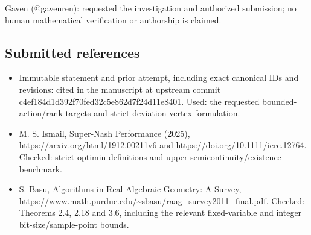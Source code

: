 \documentclass[11pt]{article}
\theoremstyle{remark}
\begin{document}
Gaven (@gavenren): requested the investigation and authorized submission; no human mathematical verification or authorship is claimed.

\subsection{Submitted references}

\begin{itemize}
\item
  Immutable statement and prior attempt, including exact canonical IDs and revisions: cited in the manuscript at upstream commit c4ef184d1d392f70fed32c5e862d7f24d11e8401. Used: the requested bounded-action/rank targets and strict-deviation vertex formulation.
\item
  M. S. Ismail, Super-Nash Performance (2025), https://arxiv.org/html/1912.00211v6 and https://doi.org/10.1111/iere.12764. Checked: strict optimin definitions and upper-semicontinuity/existence benchmark.
\item
  S. Basu, Algorithms in Real Algebraic Geometry: A Survey, https://www.math.purdue.edu/\textasciitilde sbasu/raag\_survey2011\_final.pdf. Checked: Theorems 2.4, 2.18 and 3.6, including the relevant fixed-variable and integer bit-size/sample-point bounds.
\end{itemize}
\end{document}
